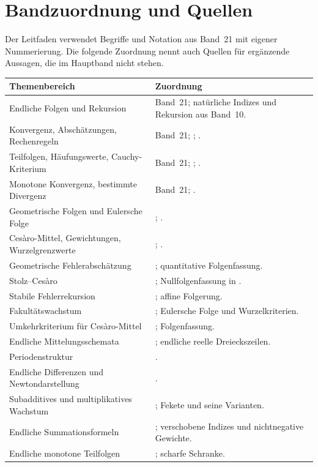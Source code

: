 \chapter{Bandzuordnung und Quellen}
\label{b21guide:ch:sources}

Der Leitfaden verwendet Begriffe und Notation aus Band~21
mit eigener Nummerierung. Die folgende Zuordnung nennt auch
Quellen für ergänzende Aussagen, die im Hauptband nicht stehen.

\begin{center}
\small
\begin{tabularx}{\linewidth}{@{}p{.37\linewidth}X@{}}
\toprule
Themenbereich & Zuordnung\\
\midrule
Endliche Folgen und Rekursion &
Band~21; natürliche Indizes und Rekursion aus Band~10.\\
Konvergenz, Abschätzungen, Rechenregeln &
Band~21; \cite[Abschnitte~2.1--2.2]{lebl};
\cite[Sätze~3.23, 3.26]{hunter}.\\
Teilfolgen, Häufungswerte, Cauchy-Kriterium &
Band~21; \cite[Abschnitte~2.3--2.4]{lebl};
\cite[Sätze~3.46, 3.57--3.58]{hunter}.\\
Monotone Konvergenz, bestimmte Divergenz &
Band~21; \cite[Satz~2.1.10 und Abschnitt~2.3]{lebl}.\\
Geometrische Folgen und Eulersche Folge &
\cite[Propositionen~2.2.11--2.2.12]{lebl};
\cite[Propositionen~3.31--3.32]{hunter}.\\
Cesàro-Mittel, Gewichtungen, Wurzelgrenzwerte &
\cite[Abschnitt~6.9]{semmes};
\cite[Druckseiten~1 und~3]{stolz}.\\
Geometrische Fehlerabschätzung &
\cite[Aufgabe~2.4.2]{lebl}; quantitative Folgenfassung.\\
Stolz--Cesàro &
\cite{stolz}; Nullfolgenfassung in \cite{mathtutor}.\\
Stabile Fehlerrekursion &
\cite[Druckseite~4, Lemma, Teil~(1)]{berinde}; affine Folgerung.\\
Fakultätswachstum &
\cite[Beispiel~1.1.4]{yan}; Eulersche Folge und Wurzelkriterien.\\
Umkehrkriterium für Cesàro-Mittel &
\cite[Druckseite~100, Satz~8.9]{mcmullen}; Folgenfassung.\\
Endliche Mittelungsschemata &
\cite[Abschnitt~1]{fan}; endliche reelle Dreieckszeilen.\\
Periodenstruktur &
\cite[Abschnitt~4.7.1]{grinberg}.\\
Endliche Differenzen und Newtondarstellung &
\cite[Abschnitt~5.3, (5.44)]{concrete}.\\
Subadditives und multiplikatives Wachstum &
\cite[PDF-Seite~10]{bruin}; Fekete und seine Varianten.\\
Endliche Summationsformeln &
\cite[Seite~1]{li}; verschobene Indizes und nichtnegative Gewichte.\\
Endliche monotone Teilfolgen &
\cite[Seiten~467--468]{erdos-szekeres}; scharfe Schranke.\\
\bottomrule
\end{tabularx}
\end{center}

